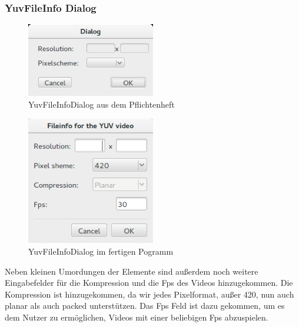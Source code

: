 \documentclass{scrartcl}
\begin{document}
{\subsubsection{YuvFileInfo Dialog}
\bigskip
\begin{figure}[ht]
\centering
\includegraphics[width=0.5\textwidth]{Pictures/fileinfoalt.jpg}
\caption{YuvFileInfoDialog aus dem Pflichtenheft}
\end{figure}
\begin{figure}[ht]
\centering
\includegraphics[width=0.5\textwidth]{Pictures/fileinfoneu.png}
\caption{YuvFileInfoDialog im fertigen Pogramm}
\end{figure}
Neben kleinen Umordungen der Elemente sind außerdem noch weitere Eingabefelder für die Kompression und die Fps des Videos hinzugekommen. Die Kompression ist hinzugekommen, da wir jedes Pixelformat, außer 420, nun auch planar als auch packed unterstützen. Das Fps Feld ist dazu gekommen, um es dem Nutzer zu ermöglichen, Videos mit einer beliebigen Fps abzuspielen.
\newpage
}
\end{document}
